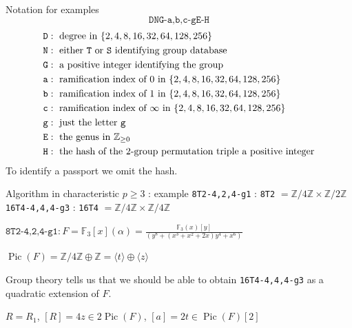 \documentclass[xcolor=dvipsnames]{beamer}
\theoremstyle{plain}
\newcommand{\ZZ}{\mathbb Z}
\newcommand{\FF}{\mathbb{F}}
\DeclareMathOperator{\Pic}{Pic}
\begin{document}
{    \begin{frame}{Notation for examples}
      \begin{equation*}
        \texttt{DNG-a,b,c-gE-H}
      \end{equation*}
      \begin{align*}
        \texttt{D} &:\text{ degree in }
        \{2,4,8,16,32,64,128,256\}\\
        \texttt{N} &:\text{ either \texttt{T}
        or \texttt{S} identifying group
        database}\\
        \texttt{G} &:\text{ a positive integer
        identifying the group}\\
        \texttt{a} &:\text{ ramification index
        of $0$ in }
        \{2,4,8,16,32,64,128,256\}\\
        \texttt{b} &:\text{ ramification index
        of $1$ in }
        \{2,4,8,16,32,64,128,256\}\\
        \texttt{c} &:\text{ ramification index
        of $\infty$ in }
        \{2,4,8,16,32,64,128,256\}\\
        \texttt{g} &:\text{ just the letter 
        \texttt{g}}\\
        \texttt{E} &:\text{ the genus in }
        \ZZ_{\geq 0}\\
        \texttt{H} &:\text{ the hash
        of the $2$-group permutation triple 
        a positive integer}
      \end{align*}
      \pause
      To identify a passport we omit the hash.
    \end{frame}
    \begin{frame}{Algorithm in characteristic $p\geq 3$ : example}
      \texttt{8T2-4,2,4-g1} : \texttt{8T2} $=\ZZ/4\ZZ\times\ZZ/2\ZZ$
      \newline
      \texttt{16T4-4,4,4-g3} : \texttt{16T4} $=\ZZ/4\ZZ\times\ZZ/4\ZZ$
      \pause\par
      $\texttt{8T2-4,2,4-g1} : F = \FF_3[x](\alpha)=\frac{\FF_3(x)[y]}{(y^8 + (x^3 + x^2 + 2x)y^4 + x^6)}$
      \pause\par
      $\Pic(F) = \ZZ/4\ZZ\oplus\ZZ =
      \langle t\rangle\oplus\langle z\rangle$
      \pause\par
      Group theory tells us that we should be able to obtain
      \texttt{16T4-4,4,4-g3} as a quadratic extension
      of $F$.
      \pause\par
      $R = R_1$, $[R] = 4z\in 2\Pic(F)$, $[a]=2t\in\Pic(F)[2]$

\end{frame}}
\end{document}

